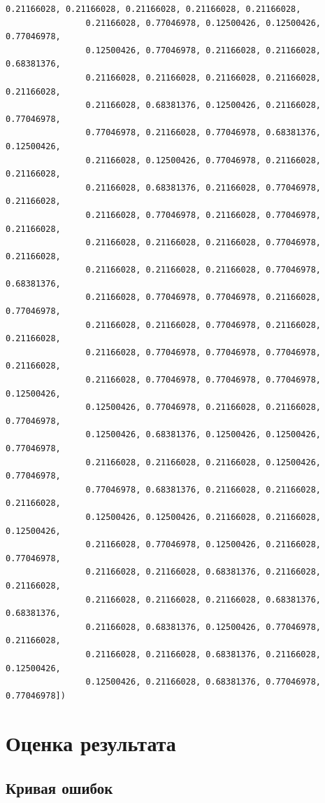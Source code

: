 \documentclass[11pt]{article}
\begin{document}
\begin{Verbatim}[commandchars=\\\{\}]
                0.21166028, 0.21166028, 0.21166028, 0.21166028, 0.21166028,
                0.21166028, 0.77046978, 0.12500426, 0.12500426, 0.77046978,
                0.12500426, 0.77046978, 0.21166028, 0.21166028, 0.68381376,
                0.21166028, 0.21166028, 0.21166028, 0.21166028, 0.21166028,
                0.21166028, 0.68381376, 0.12500426, 0.21166028, 0.77046978,
                0.77046978, 0.21166028, 0.77046978, 0.68381376, 0.12500426,
                0.21166028, 0.12500426, 0.77046978, 0.21166028, 0.21166028,
                0.21166028, 0.68381376, 0.21166028, 0.77046978, 0.21166028,
                0.21166028, 0.77046978, 0.21166028, 0.77046978, 0.21166028,
                0.21166028, 0.21166028, 0.21166028, 0.77046978, 0.21166028,
                0.21166028, 0.21166028, 0.21166028, 0.77046978, 0.68381376,
                0.21166028, 0.77046978, 0.77046978, 0.21166028, 0.77046978,
                0.21166028, 0.21166028, 0.77046978, 0.21166028, 0.21166028,
                0.21166028, 0.77046978, 0.77046978, 0.77046978, 0.21166028,
                0.21166028, 0.77046978, 0.77046978, 0.77046978, 0.12500426,
                0.12500426, 0.77046978, 0.21166028, 0.21166028, 0.77046978,
                0.12500426, 0.68381376, 0.12500426, 0.12500426, 0.77046978,
                0.21166028, 0.21166028, 0.21166028, 0.12500426, 0.77046978,
                0.77046978, 0.68381376, 0.21166028, 0.21166028, 0.21166028,
                0.12500426, 0.12500426, 0.21166028, 0.21166028, 0.12500426,
                0.21166028, 0.77046978, 0.12500426, 0.21166028, 0.77046978,
                0.21166028, 0.21166028, 0.68381376, 0.21166028, 0.21166028,
                0.21166028, 0.21166028, 0.21166028, 0.68381376, 0.68381376,
                0.21166028, 0.68381376, 0.12500426, 0.77046978, 0.21166028,
                0.21166028, 0.21166028, 0.68381376, 0.21166028, 0.12500426,
                0.12500426, 0.21166028, 0.68381376, 0.77046978, 0.77046978])
\end{Verbatim}
            
    \hypertarget{ux43eux446ux435ux43dux43aux430-ux440ux435ux437ux443ux43bux44cux442ux430ux442ux430}{%
\section{Оценка
результата}\label{ux43eux446ux435ux43dux43aux430-ux440ux435ux437ux443ux43bux44cux442ux430ux442ux430}}

\hypertarget{ux43aux440ux438ux432ux430ux44f-ux43eux448ux438ux431ux43eux43a}{%
\subsection{Кривая
ошибок}\label{ux43aux440ux438ux432ux430ux44f-ux43eux448ux438ux431ux43eux43a}}
\end{document}
